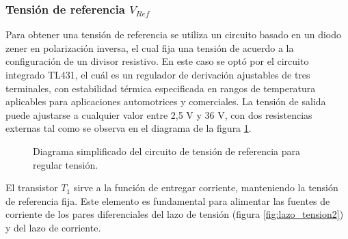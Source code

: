\documentclass[]{article}
\begin{document}
\subsubsection{Tensión de referencia $V_{Ref}$}
\FloatBarrier
Para obtener una tensión de referencia se utiliza un circuito basado en un diodo zener en polarización inversa, el cual fija una tensión de acuerdo a la configuración de un divisor resistivo. En este caso se optó por el circuito integrado TL431, el cuál es un regulador de derivación ajustables de tres terminales, con estabilidad térmica especificada en rangos de temperatura aplicables para aplicaciones automotrices y comerciales. La tensión de salida puede ajustarse a cualquier valor entre 2,5 V y 36 V, con dos resistencias externas tal como se observa en el diagrama de la figura \ref{fig:vref_t}.

\begin{figure}[h]
	\centering
{}
	
	\caption{Diagrama simplificado del circuito de tensión de referencia para regular tensión.}
	\label{fig:vref_t}
\end{figure}

El transistor $T_1$ sirve a la función de entregar corriente, manteniendo la tensión de referencia fija. Este elemento es fundamental para alimentar las fuentes de corriente de los pares diferenciales del lazo de tensión (figura \ref{fig:lazo_tension2}) y del lazo de corriente.
\end{document}
